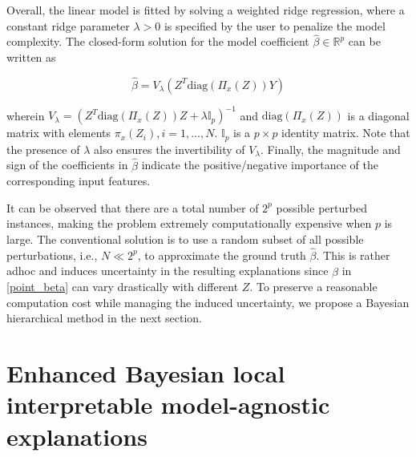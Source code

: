 \documentclass{article}
\theoremstyle{plain}
\theoremstyle{definition}
\theoremstyle{remark}
\begin{document}
Overall, the linear model is fitted by solving a weighted ridge regression, where a constant ridge parameter $\lambda>0$ is specified by the user to penalize the model complexity. The closed-form solution for the model coefficient $\hat{\beta}\in \mathbb{R}^p$ can be written as 

\begin{equation} \label{point_beta}
    \hat{\beta} = V_\lambda (Z^T\textrm{diag}(\Pi_x(Z))Y)
\end{equation} 

wherein $V_\lambda = (Z^T\textrm{diag}(\Pi_x(Z))Z + \lambda\mathbb{I}_p)^{-1}$ and $\textrm{diag}(\Pi_x(Z))$ is a diagonal matrix with elements $\pi_x(Z_i), i = 1,...,N$. $\mathbb{I}_p$ is a $p\times p$ identity matrix. Note that the presence of $\lambda$ also ensures the invertibility of $V_\lambda$. Finally, the magnitude and sign of the coefficients in $\hat{\beta}$ indicate the positive/negative importance of the corresponding input features.

It can be observed that there are a total number of $2^p$ possible perturbed instances, making the problem extremely computationally expensive when $p$ is large. The conventional solution is to use a random subset of all possible perturbations, i.e., $N\ll 2^p$, to approximate the ground truth $\hat{\beta}$. This is rather adhoc and induces uncertainty in the resulting explanations since $\hat{\beta}$ in \cref{point_beta} can vary drastically with different $Z$. To preserve a reasonable computation cost while managing the induced uncertainty, we propose a Bayesian hierarchical method in the next section. 

\section{Enhanced Bayesian local interpretable
model-agnostic explanations}\label{methodology}
\end{document}
